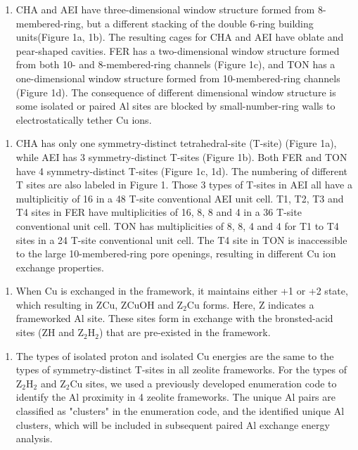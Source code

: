 \documentclass[12pt]{article}
\begin{document}
\begin{enumerate}
\item CHA and AEI have three-dimensional window structure formed from 8-membered-ring, but a different stacking of the double 6-ring building units(Figure 1a, 1b). The resulting cages for CHA and AEI have oblate and pear-shaped cavities. FER has a two-dimensional window structure formed from both 10- and 8-membered-ring channels (Figure 1c), and TON has a one-dimensional window structure formed from 10-membered-ring channels (Figure 1d).  The consequence of different dimensional window structure is some isolated or paired Al sites are blocked by small-number-ring walls to electrostatically tether Cu ions.
\end{enumerate}

\begin{enumerate}[resume]
\item CHA has only one symmetry-distinct tetrahedral-site (T-site) (Figure 1a), while AEI has 3 symmetry-distinct T-sites (Figure 1b). Both FER and TON have 4 symmetry-distinct T-sites (Figure 1c, 1d). The numbering of different T sites are also labeled in Figure 1. Those 3 types of T-sites in AEI all have a multiplicitiy of 16 in a 48 T-site conventional AEI unit cell. T1, T2, T3 and T4 sites in FER have multiplicities of 16, 8, 8 and 4 in a 36 T-site conventional unit cell. TON has multiplicities of 8, 8, 4 and 4 for T1 to T4 sites in a 24 T-site conventional unit cell. The T4 site in TON is inaccessible to the large 10-membered-ring pore openings, resulting in different Cu ion exchange properties.
\end{enumerate}

\begin{enumerate}[resume]
\item When Cu is exchanged in the framework, it maintains either +1 or +2 state, which resulting in ZCu, ZCuOH and Z$_{2}$Cu forms. Here, Z indicates a frameworked Al site. These sites form in exchange with the bronsted-acid sites (ZH and Z$_{2}$H$_{2}$) that are pre-existed in the framework.
\end{enumerate}

\begin{enumerate}[resume]
\item The types of isolated proton and isolated Cu energies are the same to the types of symmetry-distinct T-sites in all zeolite frameworks. For the types of Z$_{2}$H$_{2}$ and Z$_{2}$Cu sites, we used a previously developed enumeration code to identify the Al proximity in 4 zeolite frameworks.\cite{Paolucci2016} The unique Al pairs are classified as "clusters" in the enumeration code, and the identified unique Al clusters, which will be included in subsequent paired Al exchange energy analysis.
\end{enumerate}
\end{document}

